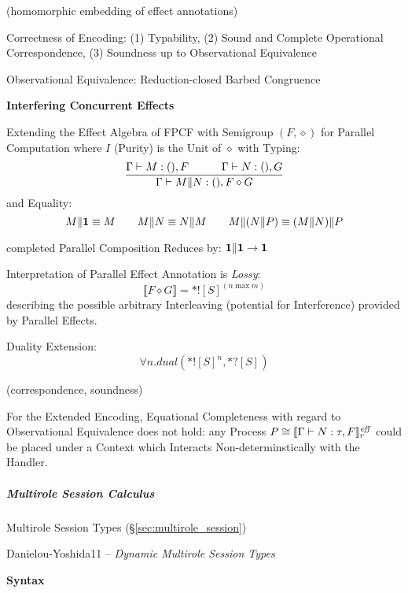 (homomorphic embedding of effect annotations) %

Correctness of Encoding: (1) Typability, (2) Sound and Complete
Operational Correspondence, (3) Soundness up to Observational
Equivalence %

Observational Equivalence: Reduction-closed Barbed Congruence %


\asterism


\textbf{Interfering Concurrent Effects}

Extending the Effect Algebra of FPCF with Semigroup $(F,\diamond)$ for
Parallel Computation where $I$ (Purity) is the Unit of $\diamond$ with
Typing:
\[
  \frac{\Gamma \vdash M:\mathsf{()},F \quad\quad\quad \Gamma \vdash N:\mathsf{()},G}
  {\Gamma \vdash M\|N:\mathsf{()},F \diamond G}
\]
and Equality:
\[
  M\|\mathbf{1} \equiv M \quad\quad M\|N \equiv N\|M
    \quad\quad M\|(N\|P) \equiv (M\|N)\|P
\]

completed Parallel Composition Reduces by: $\mathbf{1}\|\mathbf{1}
\rightarrow \mathbf{1}$

Interpretation of Parallel Effect Annotation is \emph{Lossy}:
\[
  \llbracket F \diamond G \rrbracket = *![S]^(n \;\text{max}\; m)
\]
describing the possible arbitrary Interleaving (potential for
Interference) provided by Parallel Effects. %

Duality Extension:
\[
  \forall n.dual(*![S]^n,*?[S])
\]

(correspondence, soundness) %

For the Extended Encoding, Equational Completeness with regard to
Observational Equivalence does not hold: any Process $P \cong
\llbracket \Gamma \vdash N:\tau,F \rrbracket_r^{\text{\emph{eff}}}$ could be placed
under a Context which Interacts Non-determinstically with the Handler.



\subparagraph{Multirole Session Calculus}
\label{sec:multirole_session_calculus}\hfill

\fist Multirole Session Types (\S\ref{sec:multirole_session})

Danielou-Yoshida11 -- \emph{Dynamic Multirole Session Types}

\textbf{Syntax}

